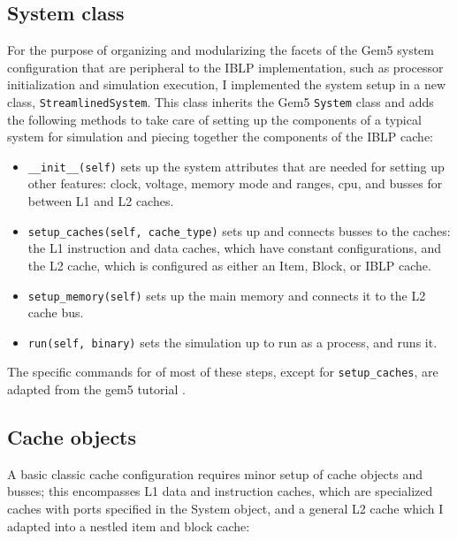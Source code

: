 \documentclass[12pt,twoside]{reedthesis}
\begin{document}
	\subsection*{System class}

	For the purpose of organizing and modularizing the facets of the Gem5 system configuration that are peripheral to the IBLP implementation, such as processor initialization and simulation execution, I implemented the system setup in a new class, \verb`StreamlinedSystem`. This class inherits the Gem5 \verb`System` class and adds the following methods to take care of setting up the components of a typical system for simulation and piecing together the components of the IBLP cache:

	\begin{itemize}
		\item \verb`__init__(self)` sets up the system attributes that are needed for setting up other features: clock, voltage, memory mode and ranges, cpu, and busses for between L1 and L2 caches.
	
		\item \verb`setup_caches(self, cache_type)` sets up and connects busses to the caches: the L1 instruction and data caches, which have constant configurations, and the L2 cache, which is configured as either an Item, Block, or IBLP cache.
	
		\item \verb`setup_memory(self)` sets up the main memory and connects it to the L2 cache bus.
	
		\item \verb`run(self, binary)` sets the simulation up to run as a process, and runs it.
	\end{itemize}

	The specific commands for of most of these steps, except for \verb`setup_caches`, are adapted from the gem5 tutorial \cite{gem5-tutorial}.

	\subsection*{Cache objects}

	A basic classic cache configuration requires minor setup of cache objects and busses; this encompasses L1 data and instruction caches, which are specialized caches with ports specified in the System object, and a general L2 cache which I adapted into a nestled item and block cache:
\end{document}
